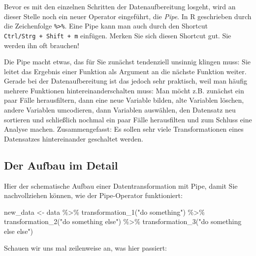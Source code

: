 \documentclass[
]{book}
\newenvironment{Shaded}{\begin{snugshade}}{\end{snugshade}}
\newcommand{\FunctionTok}[1]{\textcolor[rgb]{0.00,0.00,0.00}{#1}}
\newcommand{\NormalTok}[1]{#1}
\newcommand{\OtherTok}[1]{\textcolor[rgb]{0.56,0.35,0.01}{#1}}
\newcommand{\SpecialCharTok}[1]{\textcolor[rgb]{0.00,0.00,0.00}{#1}}
\newcommand{\StringTok}[1]{\textcolor[rgb]{0.31,0.60,0.02}{#1}}
\begin{document}
Bevor es mit den einzelnen Schritten der Datenaufbereitung losgeht, wird an dieser Stelle noch ein neuer Operator eingeführt, die \emph{Pipe}. In R geschrieben durch die Zeichenfolge \texttt{\%\textgreater{}\%}. Eine Pipe kann man auch durch den Shortcut \texttt{Ctrl/Strg\ +\ Shift\ +\ m} einfügen. Merken Sie sich diesen Shortcut gut. Sie werden ihn oft brauchen!

Die Pipe macht etwas, das für Sie zunächst tendenziell unsinnig klingen muss: Sie leitet das Ergebnis einer Funktion als Argument an die nächste Funktion weiter. Gerade bei der Datenaufbereitung ist das jedoch sehr praktisch, weil man häufig mehrere Funktionen hintereinanderschalten muss: Man möcht z.B. zunächst ein paar Fälle herausfiltern, dann eine neue Variable bilden, alte Variablen löschen, andere Variablen umcodieren, dann Variablen auswählen, den Datensatz neu sortieren und schließlich nochmal ein paar Fälle herausfilten und zum Schluss eine Analyse machen. Zusammengefasst: Es sollen sehr viele Transformationen eines Datensatzes hintereinander geschaltet werden.

\hypertarget{der-aufbau-im-detail}{%
\subsection{Der Aufbau im Detail}\label{der-aufbau-im-detail}}

Hier der schematische Aufbau einer Datentransformation mit Pipe, damit Sie nachvollziehen können, wie der Pipe-Operator funktioniert:

\begin{Shaded}
\begin{Highlighting}[]
\NormalTok{new\_data }\OtherTok{\textless{}{-}}\NormalTok{ data }\SpecialCharTok{\%\textgreater{}\%} 
  \FunctionTok{transformation\_1}\NormalTok{(}\StringTok{"do something"}\NormalTok{) }\SpecialCharTok{\%\textgreater{}\%}
  \FunctionTok{transformation\_2}\NormalTok{(}\StringTok{"do something else"}\NormalTok{) }\SpecialCharTok{\%\textgreater{}\%}
  \FunctionTok{transformation\_3}\NormalTok{(}\StringTok{"do something else else"}\NormalTok{) }
\end{Highlighting}
\end{Shaded}

Schauen wir uns mal zeilenweise an, was hier passiert:
\end{document}
